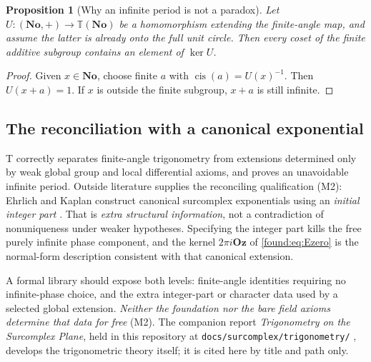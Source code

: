 \documentclass[11pt,letterpaper]{article}
\numberwithin{equation}{section}
\newtheorem{proposition}[theorem]{Proposition}
\theoremstyle{definition}
\theoremstyle{remark}
\newcommand{\No}{\mathbf{No}}
\newcommand{\Oz}{\mathbf{Oz}}
\newcommand{\cis}{\operatorname{cis}}
\begin{document}
\begin{proposition}[Why an infinite period is not a paradox]\label{found:prop:period}
Let $U:(\No,+)\to\mathbb T(\No)$ be a homomorphism extending the finite-angle
map, and assume the latter is already onto the full unit circle. Then every
coset of the finite additive subgroup contains an element of $\ker U$.
\end{proposition}
\begin{proof}
Given $x\in\No$, choose finite $a$ with $\cis(a)=U(x)^{-1}$. Then $U(x+a)=1$.
If $x$ is outside the finite subgroup, $x+a$ is still infinite.
\end{proof}

\subsection{The reconciliation with a canonical exponential}
\label{found:sub:canonicalexp}
T correctly separates finite-angle trigonometry from extensions determined only
by weak global group and local differential axioms, and proves an unavoidable
infinite period. Outside literature supplies the reconciling qualification (M2):
Ehrlich and Kaplan construct canonical surcomplex exponentials using an
\emph{initial integer part} \cite{found:EhrlichKaplanExp}. That is \emph{extra
structural information}, not a contradiction of nonuniqueness under weaker
hypotheses. Specifying the integer part kills the free purely infinite phase
component, and the kernel $2\pi i\Oz$ of \eqref{found:eq:Ezero} is the
normal-form description consistent with that canonical extension.

A formal library should expose both levels: finite-angle identities requiring no
infinite-phase choice, and the extra integer-part or character data used by a
selected global extension. \emph{Neither the foundation nor the bare field
axioms determine that data for free} (M2). The companion report
\emph{Trigonometry on the Surcomplex Plane}, held in this repository at
\texttt{docs/surcomplex/trigonometry/} \cite{found:CompanionTrig}, develops the
trigonometric theory itself; it is cited here by title and path only.
\end{document}
